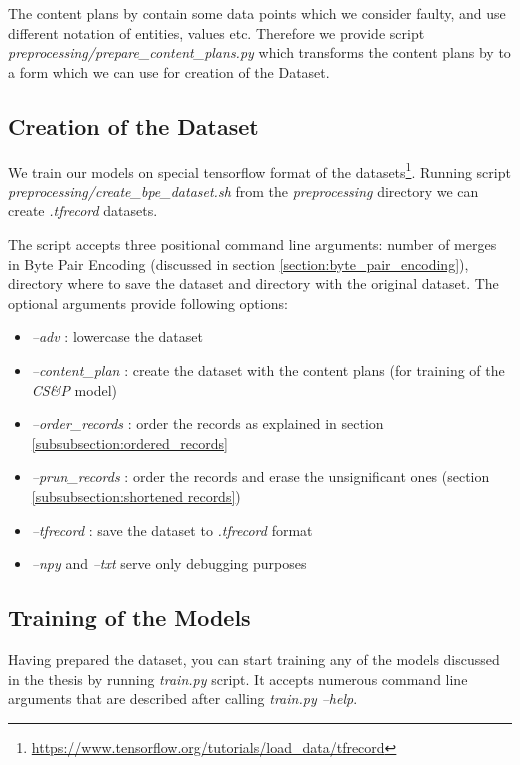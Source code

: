 The content plans by \citet{puduppully2019datatotext} contain some data points which we consider faulty, and use different notation of entities, values etc. Therefore we provide script \emph{preprocessing/prepare\_content\_plans.py} which transforms the content plans by \citet{puduppully2019datatotext} to a form which we can use for creation of the Dataset.

\subsection{Creation of the Dataset}

We train our models on special tensorflow format of the datasets\footnote{\url{https://www.tensorflow.org/tutorials/load_data/tfrecord}}. Running script \emph{preprocessing/create\_bpe\_dataset.sh} from the \emph{preprocessing} directory we can create \emph{.tfrecord} datasets.

The script accepts three positional command line arguments: number of merges in Byte Pair Encoding (discussed in section \ref{section:byte_pair_encoding}), directory where to save the dataset and directory with the original dataset. The optional arguments provide following options:
\begin{itemize}
    \item \emph{--adv} : lowercase the dataset
    \item \emph{--content\_plan} : create the dataset with the content plans (for training of the \emph{CS\&P} model)
    \item \emph{--order\_records} : order the records as explained in section \ref{subsubsection:ordered_records}
    \item \emph{--prun\_records} : order the records and erase the unsignificant ones (section \ref{subsubsection:shortened records})
    \item \emph{--tfrecord} : save the dataset to \emph{.tfrecord} format
    \item \emph{--npy} and \emph{--txt} serve only debugging purposes
\end{itemize}

\subsection{Training of the Models}

Having prepared the dataset, you can start training any of the models discussed in the thesis by running \emph{train.py} script. It accepts numerous command line arguments that are described after calling \emph{train.py --help}.

